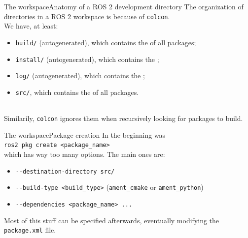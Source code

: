 \begin{frame}{The workspace}{Anatomy of a ROS 2 development directory}
  \justifying
  The organization of directories in a ROS 2 workspace is  because of \texttt{colcon}.\\
  We have, at least:
  \begin{itemize}
    \item \texttt{build/} (autogenerated), which contains the  of all packages;
    \item \texttt{install/} (autogenerated), which contains the ;
    \item \texttt{log/} (autogenerated), which contains the ;
    \item \texttt{src/}, which contains the  of all packages.
  \end{itemize}
  \begin{alertblock}{}
    \centering
    \\
    Similarily, \texttt{colcon} ignores them when recursively looking for packages to build.
  \end{alertblock}
\end{frame}
\begin{frame}{The workspace}{Package creation}
  \justifying
  In the beginning was\\
  \bigskip
  \texttt{ros2 pkg create <package\_name>}\\
  \bigskip
  which has way too many options. The main ones are:
  \begin{itemize}
    \item \texttt{-{}-destination-directory src/}
    \item \texttt{-{}-build-type <build\_type>} (\texttt{ament\_cmake} or \texttt{ament\_python})
    \item \texttt{-{}-dependencies <package\_name> ...}
  \end{itemize}
  \bigskip
  Most of this stuff can be specified afterwards, eventually modifying the \texttt{package.xml} file.
\end{frame}
